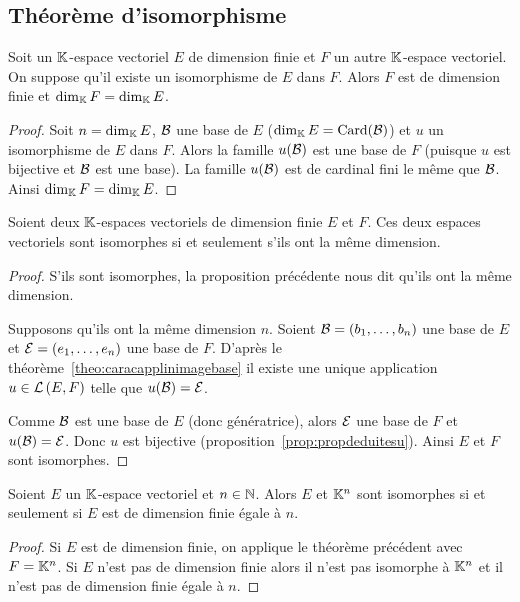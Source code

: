 \subsection{Théorème d'isomorphisme}

\begin{prop}
  Soit un $\mathbb{K}$-espace vectoriel $E$ de dimension finie et $F$ un autre $\mathbb{K}$-espace vectoriel. On suppose qu'il existe un isomorphisme de $E$ dans $F$. Alors $F$ est de dimension finie et $\operatorname{dim}_{\mathbb{K}} F = \operatorname{dim}_{\mathbb{K}} E$.
\end{prop}
\begin{proof}
  Soit $n = \operatorname{dim}_{\mathbb{K}} E$, $\mathcal{B}$ une base de $E$ ($\operatorname{dim}_{\mathbb{K}} E = \operatorname{Card}(\mathcal{B})$) et $u$ un isomorphisme de $E$ dans $F$. Alors la famille $u(\mathcal{B})$ est une base de $F$ (puisque $u$ est bijective et $\mathcal{B}$ est une base). La famille $u(\mathcal{B})$ est de cardinal fini le même que $\mathcal{B}$. Ainsi $\operatorname{dim}_{\mathbb{K}} F = \operatorname{dim}_{\mathbb{K}} E$.
\end{proof}

\begin{theo}
  Soient deux $\mathbb{K}$-espaces vectoriels de dimension finie $E$ et $F$. Ces deux espaces vectoriels sont isomorphes si et seulement s'ils ont la même dimension.
\end{theo}
\begin{proof}
  S'ils sont isomorphes, la proposition précédente nous dit qu'ils ont la même dimension.

  Supposons qu'ils ont la même dimension $n$. Soient $\mathcal{B}=(b_1, \ldots, b_n)$ une base de $E$ et $\mathcal{E}=(e_1, \ldots, e_n)$ une base de $F$. D'après le théorème~\ref{theo:caracapplinimagebase} il existe une unique application $u \in \mathcal{L}\left(E,F\right)$ telle que $u(\mathcal{B})=\mathcal{E}$.

  Comme $\mathcal{B}$ est une base de $E$ (donc génératrice), alors $\mathcal{E}$ une base de $F$ et $u(\mathcal{B})=\mathcal{E}$. Donc $u$ est bijective (proposition~\ref{prop:propdeduitesu}). Ainsi $E$ et $F$ sont isomorphes.
\end{proof}

\begin{corth}
  Soient $E$ un $\mathbb{K}$-espace vectoriel et $n \in \mathbb{N}$. Alors $E$ et $\mathbb{K}^n$ sont isomorphes si et seulement si $E$ est de dimension finie égale à $n$.
\end{corth}
\begin{proof}
  Si $E$ est de dimension finie, on applique le théorème précédent avec $F=\mathbb{K}^n$. Si $E$ n'est pas de dimension finie alors il n'est pas isomorphe à $\mathbb{K}^n$ et il n'est pas de dimension finie égale à $n$.
\end{proof}

